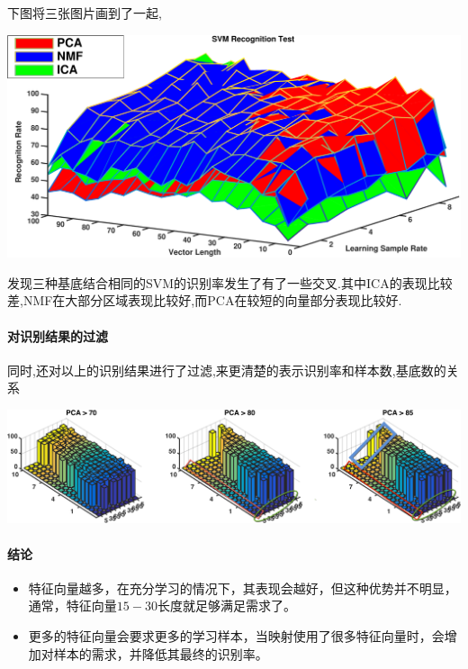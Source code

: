 	
	下图将三张图片画到了一起,	
	\begin{center}
	\begin{minipage}[t]{\linewidth}
	\center
	{
	\includegraphics[width=\textwidth]{Img/svm_pcanmfica} 
	
	}
	\end{minipage}
	\medskip
	\end{center}
	发现三种基底结合相同的SVM的识别率发生了有了一些交叉.其中ICA的表现比较差,NMF在大部分区域表现比较好,而PCA在较短的向量部分表现比较好.
	
	\paragraph{对识别结果的过滤} 同时,还对以上的识别结果进行了过滤,来更清楚的表示识别率和样本数,基底数的关系
	
		\begin{center}
	\begin{minipage}[t]{\linewidth}
	\center
	{
	\includegraphics[width=\textwidth]{Img/svm_pcafilter} 
		\captionsetup{justification=centering}
	}
	\end{minipage}
	\medskip
	\end{center}
	
	\paragraph{结论}
	\begin{itemize}
	\item 特征向量越多，在充分学习的情况下，其表现会越好，但这种优势并不明显，通常，特征向量$15-30$长度就足够满足需求了。
	\item 更多的特征向量会要求更多的学习样本，当映射使用了很多特征向量时，会增加对样本的需求，并降低其最终的识别率。
	\end{itemize}	
	
